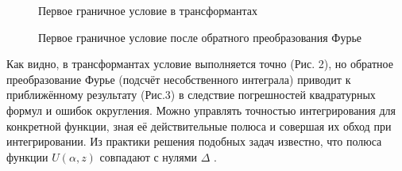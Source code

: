 \documentclass[a4paper, 12pt]{article}
\begin{document}
\begin{figure}[bh]
\noindent{}
\caption{Первое граничное условие в трансформантах}
\label{figCurves}
\end{figure}

\begin{figure}[h!]
\noindent{}
\caption{Первое граничное условие после обратного преобразования Фурье}
\label{figCurves}
\end{figure}

Как видно, в трансформантах условие выполняется точно (Рис. 2), но обратное преобразование Фурье (подсчёт несобственного интеграла) приводит к приближённому результату (Рис.3) в следствие погрешностей квадратурных формул и ошибок округления. Можно управлять точностью интегрирования для конкретной функции, зная её действительные полюса и совершая их обход при интегрировании. Из практики решения подобных задач известно, что полюса функции $U(\alpha,z)$ совпадают с нулями $\Delta$ \cite{g89,new}.
\end{document}
